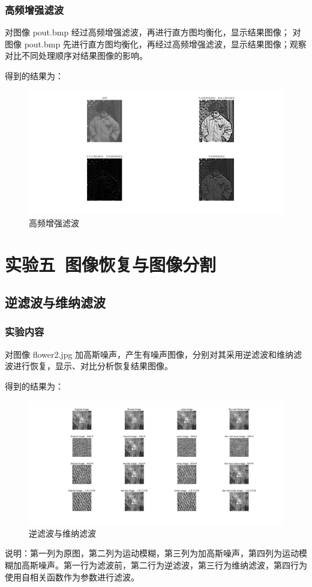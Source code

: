\documentclass{ctexart}
\begin{document}
\subsubsection{\hei 高频增强滤波}
对图像 pout.bmp 经过高频增强滤波，再进行直方图均衡化，显示结果图像； 对
图像 pout.bmp 先进行直方图均衡化，再经过高频增强滤波，显示结果图像；观察
对比不同处理顺序对结果图像的影响。
\par 得到的结果为：
\begin{figure}[H]
    \centering
    \includegraphics[scale=0.35]{4_8.png}
    \caption{高频增强滤波}
\end{figure}
\section{\hei 实验五\ 图像恢复与图像分割}
\subsection{\hei 逆滤波与维纳滤波}
\subsubsection{\hei 实验内容}
对图像 flower2.jpg 加高斯噪声，产生有噪声图像，分别对其采用逆滤波和维纳滤
波进行恢复，显示、对比分析恢复结果图像。
\par 得到的结果为：
\begin{figure}[H]
    \centering
    \includegraphics[scale=0.35]{5_1.png}
    \caption{逆滤波与维纳滤波}
\end{figure}
\par 说明：第一列为原图，第二列为运动模糊，第三列为加高斯噪声，第四列为运动模糊加高斯噪声。第一行为滤波前，第二行为逆滤波，第三行为维纳滤波，第四行为使用自相关函数作为参数进行滤波。
\end{document}
